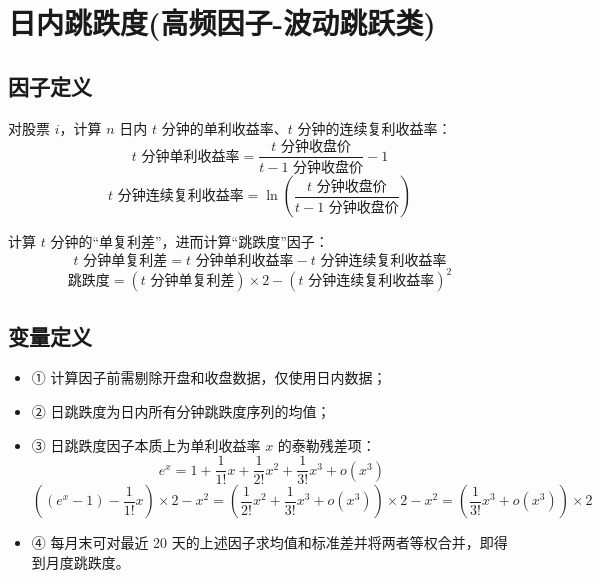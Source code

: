 \documentclass{article}
\begin{document}
\section{日内跳跌度(高频因子-波动跳跃类)}

\subsection{因子定义}
对股票 \( i \)，计算 \( n \) 日内 \( t \) 分钟的单利收益率、\( t \) 分钟的连续复利收益率：
\begin{equation}
    t \text{ 分钟单利收益率} = \frac{t \text{ 分钟收盘价}}{t-1 \text{ 分钟收盘价}} - 1
\end{equation}
\begin{equation}
    t \text{ 分钟连续复利收益率} = \ln\left(\frac{t \text{ 分钟收盘价}}{t-1 \text{ 分钟收盘价}}\right)
\end{equation}

计算 \( t \) 分钟的“单复利差”，进而计算“跳跌度”因子：
\begin{equation}
    t \text{ 分钟单复利差} = t \text{ 分钟单利收益率} - t \text{ 分钟连续复利收益率}
\end{equation}
\begin{equation}
    \text{跳跌度} = (t \text{ 分钟单复利差}) \times 2 - (t \text{ 分钟连续复利收益率})^2
\end{equation}

\subsection{变量定义}
\begin{itemize}
    \item ① 计算因子前需剔除开盘和收盘数据，仅使用日内数据；
    \item ② 日跳跌度为日内所有分钟跳跌度序列的均值；
    \item ③ 日跳跌度因子本质上为单利收益率 \( x \) 的泰勒残差项：
        \begin{equation*}
            e^x = 1 + \frac{1}{1!}x + \frac{1}{2!}x^2 + \frac{1}{3!}x^3 + o(x^3)
        \end{equation*}
        \begin{equation*}
            ((e^x - 1) - \frac{1}{1!}x) \times 2 - x^2 = \left(\frac{1}{2!}x^2 + \frac{1}{3!}x^3 + o(x^3)\right) \times 2 - x^2 = \left(\frac{1}{3!}x^3 + o(x^3)\right) \times 2
        \end{equation*}
    \item ④ 每月末可对最近 20 天的上述因子求均值和标准差并将两者等权合并，即得到月度跳跌度。
\end{itemize}
\end{document}
